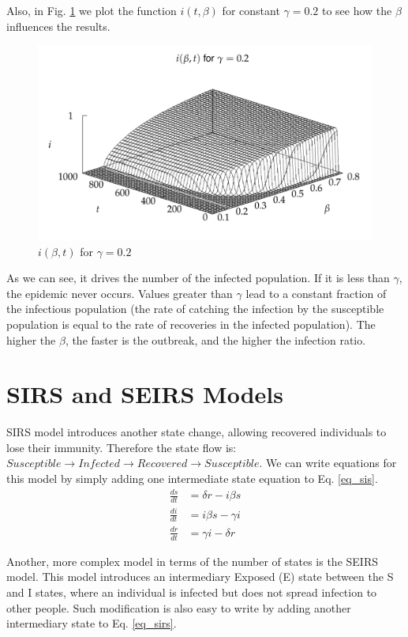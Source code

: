 Also, in Fig. \ref{fig:sis_ibt} we plot the function $i(t, \beta)$ for constant $\gamma = 0.2$ to see how the $\beta$ influences the results.
\begin{figure}[h!]
    \centering
    \includegraphics[width=\textwidth]{img/sis_ibt.png}
    \caption{$i(\beta,t)$ for $\gamma=0.2$}
    \label{fig:sis_ibt}
\end{figure}
As we can see, it drives the number of the infected population. If it is less than $\gamma$, the epidemic never occurs. Values greater than $\gamma$ lead to a constant fraction of the infectious population (the rate of catching the infection by the susceptible population is equal to the rate of recoveries in the infected population). The higher the $\beta$, the faster is the outbreak, and the higher the infection ratio.

\section{SIRS and SEIRS Models}
SIRS model introduces another state change, allowing recovered individuals to lose their immunity. Therefore the state flow is: $Susceptible → Infected → Recovered → Susceptible$. We can write equations for this model by simply adding one intermediate state equation to Eq. \ref{eq_sis}.
\begin{equation}
\begin{split} \label{eq_sirs}
\frac{ds}{dt} &= \delta r - i \beta s \\
\frac{di}{dt} &= i \beta s - \gamma i \\
\frac{dr}{dt} &= \gamma i - \delta r
\end{split}
\end{equation}

Another, more complex model in terms of the number of states is the SEIRS model. This model introduces an intermediary Exposed (E) state between the S and I states, where an individual is infected but does not spread infection to other people. Such modification is also easy to write by adding another intermediary state to Eq. \ref{eq_sirs}.

